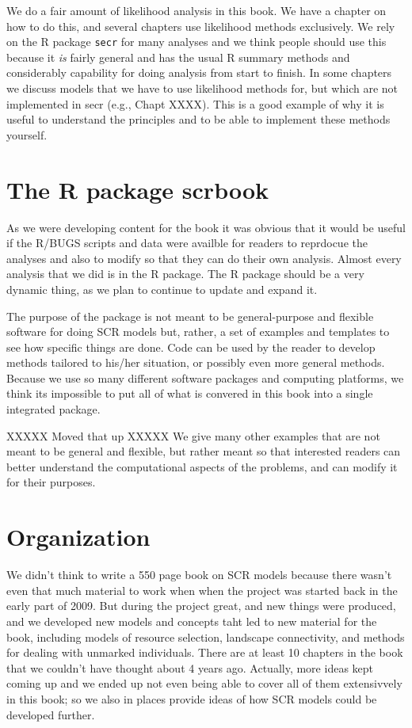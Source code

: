 We do a fair amount of likelihood analysis in this book. We have a
chapter on how to do this, and several chapters use likelihood methods
exclusively. We rely 
on the R package \mbox{\tt secr} \citep{efford_etal:2009euring} for
many analyses and we think people should use this because it {\it is}
fairly general and has the usual R summary methods and considerably
capability for doing analysis from start to finish. In some chapters
we discuss models that we have to use likelihood methods for, but
which are not implemented in secr  (e.g., Chapt XXXX). This is a good
example of why it
is useful to understand the principles and to be able to implement
these methods yourself. 


\section{The R package scrbook}

As we were developing content for the book it was obvious that it
would be useful if the
R/BUGS scripts and data were availble for readers to reprdocue the
analyses and also to modify so that they can do their own analysis. 
Almost every analysis that we did is in the R package. The R package
should be a very dynamic thing, as we plan to 
 continue to update and expand it.

The purpose of the package is  not meant to be general-purpose and
flexible software for doing SCR models but, rather, a set of examples
and templates to see how specific things are done. Code can be used by the reader to develop methods tailored to his/her situation, or possibly even more general methods.  Because we use so
many different software packages and computing platforms, we think its
impossible to put all of what is convered in this book into a single
integrated package. 

XXXXX Moved that up XXXXX
We give many other examples
that are not meant to be general and flexible, but rather meant so that
 interested readers can better understand the computational
aspects of the problems, and can modify it for their purposes.


\section{Organization}

We didn't
think to write a 550 page book on SCR models because there wasn't even
that much material to work when when the project was started back in
the early part of 2009. But during the project great, and new things were
produced, and we developed new models and concepts taht led to new
material for the book, including models of resource selection,
landscape connectivity, and methods for dealing with unmarked
individuals. There are at least 10 chapters in the book that we
couldn't have thought about 4 years ago. Actually, more ideas kept coming up and we ended up not even being able to cover all of them extensivvely in this book; so we also in places provide ideas of how SCR models could be developed further. 

